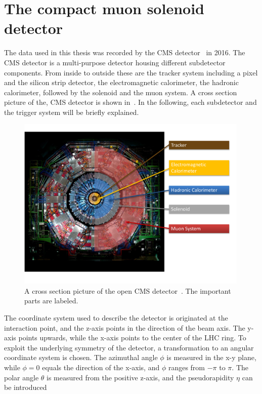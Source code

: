 \section{The compact muon solenoid detector}\label{sec:CMS}
The data used in this thesis was recorded by the CMS detector~\cite{CMS,CMSTDR} in 2016. The CMS detector is a multi-purpose detector housing different subdetector components. From inside to outside these are the tracker system including a pixel and the silicon strip detector, the electromagnetic calorimeter, the hadronic calorimeter, followed by the solenoid and the muon system. A cross section picture of the, CMS detector is shown in~. In the following, each subdetector and the trigger system will be briefly explained.\\
\begin{figure}[hbtp]
 \centering
 \includegraphics[width=0.99\textwidth]{figures/general/CMS}
 \caption{A cross section picture of the open CMS detector~\cite{CMSPicture}. The important parts are labeled.}
 \label{fig:CMS}
\end{figure}
The coordinate system used to describe the detector is originated at the interaction point, and the z-axis points in the direction of the beam axis. The y-axis points upwards, while the x-axis points to the center of the LHC ring. To exploit the underlying symmetry of the detector, a transformation to an angular coordinate system is chosen. The azimuthal angle $\phi$ is measured in the x-y plane, while $\phi=0$ equals the direction of the x-axis, and $\phi$ ranges from $-\pi$ to $\pi$. The polar angle $\theta$ is measured from the positive z-axis, and the pseudorapidity $\eta$ can be introduced
